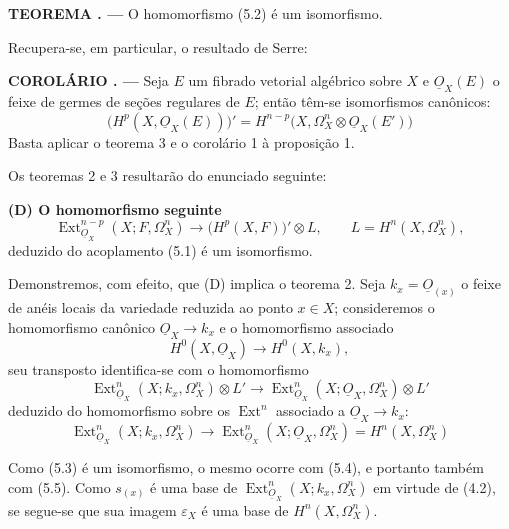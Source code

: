 \documentclass[11pt,twoside,openany]{book}
\numberwithin{equation}{section}
\newcommand{\src}[1]{%
  \phantomsection\hypertarget{src:#1}{}%
  \marginpar{\raggedleft\footnotesize\sffamily #1}%
}
\newcommand{\Osh}{\underline{O}}
\theoremstyle{plain}
\theoremstyle{definition}
\theoremstyle{remark}
\newcommand{\result}[2]{%
  \par\medskip\noindent\textbf{#1%
  \if\relax\detokenize{#2}\relax\else\space#2\fi. ---}\enspace
}
\newcommand{\FgaUnitKey}{frontmatter}
\renewcommand{\src}[1]{%
  \phantomsection\hypertarget{src:\FgaUnitKey:#1}{}%
  \marginpar{\raggedleft\footnotesize\sffamily #1}%
}
\begin{document}
\result{TEOREMA}{3} O homomorfismo (5.2) é um isomorfismo.

Recupera-se, em particular, o resultado de Serre:

\result{COROLÁRIO}{} Seja $E$ um fibrado vetorial algébrico sobre $X$ e
$\Osh_X(E)$ o feixe de germes de seções regulares de $E$; então têm-se
isomorfismos canônicos:
\begin{equation}\tag{5.3}
  \bigl(H^{p}(X,\Osh_X(E))\bigr)'
  =H^{n-p}\bigl(X,\Omega_X^{n}\otimes\Osh_X(E')\bigr)
\end{equation}
Basta aplicar o teorema 3 e o corolário 1 à proposição 1.

Os teoremas 2 e 3 resultarão do enunciado seguinte:

\noindent\textbf{(D) O homomorfismo seguinte}
\begin{equation}\tag{5.2 bis}
  \operatorname{Ext}_{\Osh_X}^{n-p}(X;F,\Omega_X^{n})
  \longrightarrow\bigl(H^{p}(X,F)\bigr)'\otimes L,
  \qquad L=H^{n}(X,\Omega_X^{n}),
\end{equation}
deduzido do acoplamento (5.1) é um isomorfismo.

Demonstremos, com efeito, que (D) implica o teorema 2. Seja
$k_x=\Osh_{(x)}$ o feixe de anéis locais da variedade reduzida ao ponto
$x\in X$; consideremos o homomorfismo canônico
$\Osh_X\longrightarrow k_x$ e o homomorfismo associado
\begin{equation}\tag{5.3}
  H^{0}(X,\Osh_X)\longrightarrow H^{0}(X,k_x),
\end{equation}
seu transposto identifica-se com o homomorfismo
\begin{equation}\tag{5.4}
  \operatorname{Ext}_{\Osh_X}^{n}(X;k_x,\Omega_X^{n})\otimes L'
  \longrightarrow
  \operatorname{Ext}_{\Osh_X}^{n}(X;\Osh_X,\Omega_X^{n})\otimes L'
\end{equation}
deduzido do homomorfismo sobre os $\operatorname{Ext}^{n}$ associado a
$\Osh_X\longrightarrow k_x$:
\begin{equation}\tag{5.5}
  \operatorname{Ext}_{\Osh_X}^{n}(X;k_x,\Omega_X^{n})
  \longrightarrow
  \operatorname{Ext}_{\Osh_X}^{n}(X;\Osh_X,\Omega_X^{n})
  =H^{n}(X,\Omega_X^{n})
\end{equation}

\src{183}
Como (5.3) é um isomorfismo, o mesmo ocorre
com (5.4), e portanto também com (5.5). Como $s_{(x)}$ é uma base de
$\operatorname{Ext}_{\Osh_X}^{n}(X;k_x,\Omega_X^{n})$ em virtude de (4.2), se
segue-se que sua imagem $\varepsilon_X$ é uma base de
$H^{n}(X,\Omega_X^{n})$.
\end{document}
